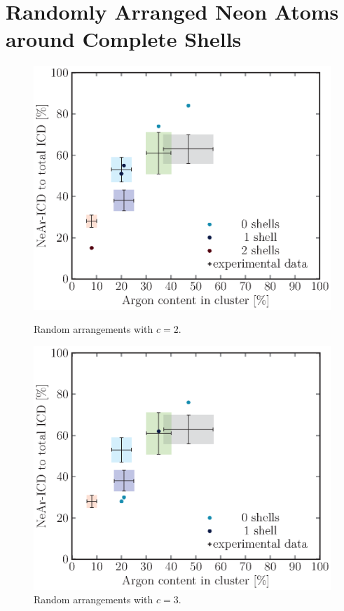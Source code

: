 \section{Randomly Arranged Neon Atoms around Complete Shells}
\begin{figure}[!H]
\begin{minipage}{0.48\textwidth}
    \centering
    \includegraphics[scale=0.5]{pics/random02.ps}
    \caption{Random arrangements with $c=2$.}
    \label{random02}
\end{minipage}
\hfill
\begin{minipage}{0.48\textwidth}
    \centering
    \includegraphics[scale=0.5]{pics/random03.ps}
    \caption{Random arrangements with $c=3$.}
    \label{random03}
\end{minipage}
\end{figure}

